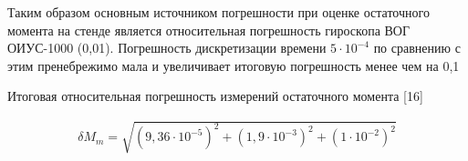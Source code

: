 Таким образом основным источником погрешности при оценке остаточного момента на стенде является относительная погрешность гироскопа ВОГ ОИУС-1000 (0,01). Погрешность дискретизации времени $5 \cdot 10^{-4}$ по сравнению с этим пренебрежимо мала и увеличивает итоговую погрешность менее чем на 0,1 %

Итоговая относительная погрешность измерений остаточного момента [16]

\begin{samepage}
	\begin{equation}
		\label{eq:final_moment_err}
		\begin{alignedat}{2}
			\delta M_m = \sqrt{(9,36 \cdot 10^{-5})^2+(1,9 \cdot 10^{-3})^2+(1\cdot 10^{-2})^2}
		\end{alignedat}
	\end{equation}
\end{samepage}











